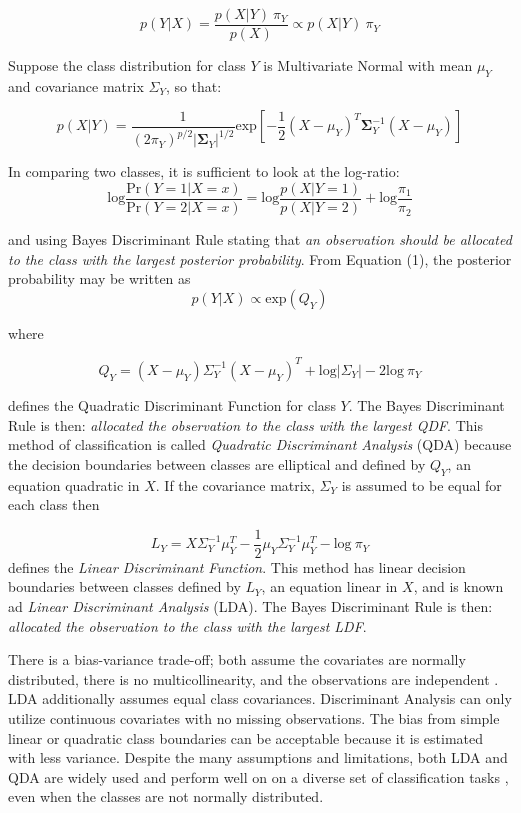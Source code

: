\documentclass[12pt,]{article}
\begin{document}
\[
p(Y \vert X) = \frac{p(X \vert Y) ~\pi_Y}{p(X)} \propto p(X \vert Y) ~\pi_Y   \tag{1}
\]

Suppose the class distribution for class \(Y\) is Multivariate Normal
with mean \(\mu_Y\) and covariance matrix \(\Sigma_Y\), so that:

\[
p(X \vert Y) = \frac{1}{(2 \pi_Y)^{p/2} \vert\boldsymbol{\Sigma}_Y\vert ^{1/2}} \text{exp} \left[-\frac{1}{2}(X - \mu_Y)^T \boldsymbol{\Sigma}^{-1}_Y(X - \mu_Y)  \right]  \tag{2}
\]

In comparing two classes, it is sufficient to look at the log-ratio: \[
\text{log} \frac{\text{Pr}(Y=1 \vert X=x)}{\text{Pr}(Y=2 \vert X=x)} = \text{log}\frac{p(X \vert Y=1)}{p(X \vert Y=2)} + \text{log}\frac{\pi_1}{\pi_2}   \tag{3}
\]

and using Bayes Discriminant Rule stating that \emph{an observation
should be allocated to the class with the largest posterior
probability}. From Equation (1), the posterior probability may be
written as \[
p(Y \vert X) \propto \text{exp} \left( Q_Y \right)    \tag{4}
\]

where

\[
Q_Y = (X - \mu_Y) \Sigma^{-1}_Y (X - \mu_Y)^T + \text{log} \vert \Sigma_Y \vert - 2\text{log} ~\pi_Y   \tag{5}
\]

defines the Quadratic Discriminant Function for class \(Y\). The Bayes
Discriminant Rule is then: \emph{allocated the observation to the class
with the largest QDF}. This method of classification is called
\emph{Quadratic Discriminant Analysis} (QDA) because the decision
boundaries between classes are elliptical and defined by \(Q_Y\), an
equation quadratic in \(X\). If the covariance matrix, \(\Sigma_Y\) is
assumed to be equal for each class then

\[
L_Y = X \Sigma^{-1}_Y \mu_Y^T -\frac{1}{2}\mu_Y \Sigma^{-1}_Y \mu_Y^T  - \text{log} ~\pi_Y     \tag{6}
\] defines the \emph{Linear Discriminant Function}. This method has
linear decision boundaries between classes defined by \(L_Y\), an
equation linear in \(X\), and is known ad \emph{Linear Discriminant
Analysis} (LDA). The Bayes Discriminant Rule is then: \emph{allocated
the observation to the class with the largest LDF}.

There is a bias-variance trade-off; both assume the covariates are
normally distributed, there is no multicollinearity, and the
observations are independent \citep{cover_geometrical_1965}. LDA
additionally assumes equal class covariances. Discriminant Analysis can
only utilize continuous covariates with no missing observations. The
bias from simple linear or quadratic class boundaries can be acceptable
because it is estimated with less variance. Despite the many assumptions
and limitations, both LDA and QDA are widely used and perform well on on
a diverse set of classification tasks \citep{hastie_elements_2009}, even
when the classes are not normally distributed.
\end{document}
